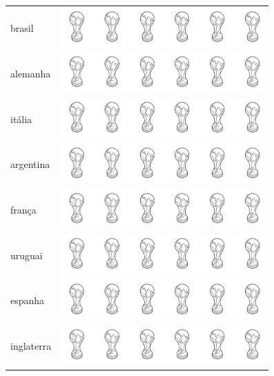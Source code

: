 \begin{longtable}[]{@{}ll@{}}
\toprule
brasil &
\includegraphics[width=3.05575in,height=0.58176in]{media/image105.png}\tabularnewline
alemanha &
\includegraphics[width=3.05575in,height=0.58176in]{media/image105.png}\tabularnewline
itália &
\includegraphics[width=3.05575in,height=0.58176in]{media/image105.png}\tabularnewline
argentina &
\includegraphics[width=3.05575in,height=0.58176in]{media/image105.png}\tabularnewline
frança &
\includegraphics[width=3.05575in,height=0.58176in]{media/image105.png}\tabularnewline
uruguai &
\includegraphics[width=3.05575in,height=0.58176in]{media/image105.png}\tabularnewline
espanha &
\includegraphics[width=3.05575in,height=0.58176in]{media/image105.png}\tabularnewline
inglaterra &
\includegraphics[width=3.05575in,height=0.58176in]{media/image105.png}\tabularnewline
\bottomrule
\end{longtable}

